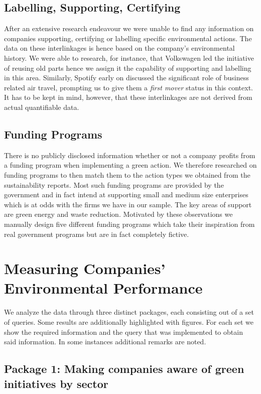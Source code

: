 \subsection{Labelling, Supporting, Certifying}
After an extensive research endeavour we were unable to find any information on companies supporting, certifying or labelling
specific environmental actions.
The data on these interlinkages is hence based on the company's environmental history.
We were able to research, for instance, that Volkswagen led the initiative of reusing old parts hence we assign it the
capability of supporting and labelling in this area.
Similarly, Spotify early on discussed the significant role of business related air travel, prompting us to give them a
\textit{first mover} status in this context.
It has to be kept in mind, however, that these interlinkages are not derived from actual quantifiable data.

\subsection{Funding Programs}
There is no publicly disclosed information whether or not a company profits from a funding program when implementing a
green action.
We therefore researched on funding programs to then match them to the action types we obtained from the sustainability
reports.
Most such funding programs are provided by the government and in fact intend at supporting small and medium size enterprises
which is at odds with the firms we have in our sample.
The key areas of support are green energy and waste reduction.
Motivated by these observations we manually design five different funding programs which take their inspiration from real government
programs but are in fact completely fictive.

\clearpage
\section{Measuring Companies' Environmental Performance} \label{sec:queries}

We analyze the data through three distinct packages, each consisting out of a set of queries.
Some results are additionally highlighted with figures.
For each set we show the required information and the query that was implemented to obtain said information.
In some instances additional remarks are noted.

\subsection{Package 1: Making companies aware of green initiatives by sector}

